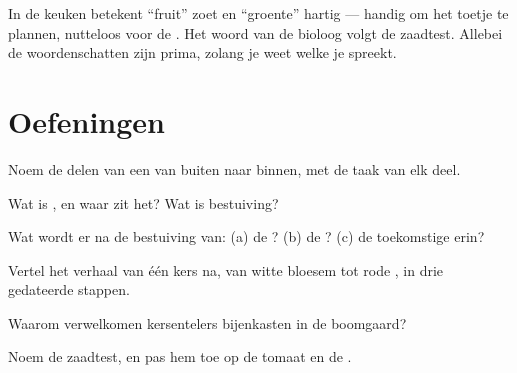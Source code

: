 \begin{remark}\label{rem:g3:flowers-fruits-seeds:words}
In de keuken betekent ``fruit'' zoet en ``groente'' hartig --- handig
om het toetje te plannen, nutteloos voor de . Het woord van de
bioloog volgt de zaadtest. Allebei de woordenschatten zijn prima, zolang
je weet welke je spreekt.
\end{remark}

\section{Oefeningen}

\begin{exercise}[$\star$]\label{exo:g3:flowers-fruits-seeds:1}
Noem de delen van een  van buiten naar binnen, met de taak van elk deel.
\end{exercise}

\begin{exercise}[$\star$]\label{exo:g3:flowers-fruits-seeds:2}
Wat is , en waar zit het? Wat is bestuiving?
\end{exercise}

\begin{exercise}[$\star$]\label{exo:g3:flowers-fruits-seeds:3}
Wat wordt er na de bestuiving van: (a) de ? (b) de ?
(c) de toekomstige  erin?
\end{exercise}

\begin{exercise}[$\star$]\label{exo:g3:flowers-fruits-seeds:4}
Vertel het verhaal van één kers na, van witte bloesem tot rode ,
in drie gedateerde stappen.
\end{exercise}

\begin{exercise}[$\star$]\label{exo:g3:flowers-fruits-seeds:5}
Waarom verwelkomen kersentelers bijenkasten in de boomgaard?
\end{exercise}

\begin{exercise}[$\star$]\label{exo:g3:flowers-fruits-seeds:6}
Noem de zaadtest, en pas hem toe op de tomaat en de .
\end{exercise}

